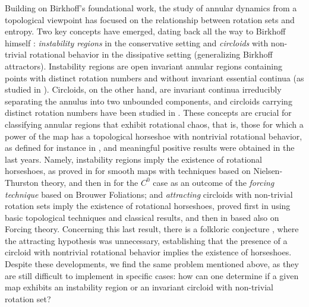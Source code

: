 \documentclass[12pt,a4paper]{amsart}
\theoremstyle{definition}
\theoremstyle{remark}
\begin{document}
Building on Birkhoff's foundational work, the study of annular dynamics from a topological viewpoint has focused on the relationship between rotation sets and entropy. Two key concepts have emerged, dating back all the way to Birkhoff himself \cite{birk1,birk2}: \emph{instability regions} in the conservative setting and \emph{circloids} with non-trivial rotational behavior in the dissipative setting (generalizing Birkhoff attractors). Instability regions are open invariant annular regions containing  points with distinct rotation numbers and without invariant essential continua (as studied in \cite{birk2,arnaud,mather1,mather2,mather3,frankspatrice}). Circloids, on the other hand, are invariant continua irreducibly separating the annulus into two unbounded components, and circloids carrying distinct rotation numbers have been studied in \cite{birk1,Levsecondorder,herman,lecalveztesis,gagltre,
veer,casdalgi,HolmesHoket,Gukholmes,walker,barge,koropeki,haiduc,laisangyoung}. These concepts are crucial for classifying annular regions that exhibit rotational chaos, that is, those for which a power of the map has a topological horseshoe with nontrivial rotational behavior, as defined for instance in \cite{paposa}, and meaningful positive results were obtained in the last years. Namely,
instability regions imply the existence of rotational horseshoes, as proved in
\cite{frankshandel} for smooth maps with techniques based on Nielsen-Thurston theory, and then
in \cite{forcing} for the $C^0$ case as an outcome of the \emph{forcing technique} based on Brouwer Foliations; and \emph{attracting}
circloids with non-trivial rotation sets imply the existence of rotational horseshoes,
proved first in \cite{paposa} using basic topological techniques and classical results, and then in \cite{lecalveztal} based also on Forcing theory.
Concerning this last result, there is a folkloric conjecture \cite{casdalgi},\cite{koropeki} where the attracting hypothesis was unnecessary, establishing that the presence of a circloid with nontrivial rotational  behavior implies the existence of horseshoes. Despite these developments, we find the same problem mentioned above, as they are still difficult to implement in specific cases: how can one determine if a given map exhibits
an instability region or an invariant circloid with non-trivial rotation set?

\medskip
\end{document}
